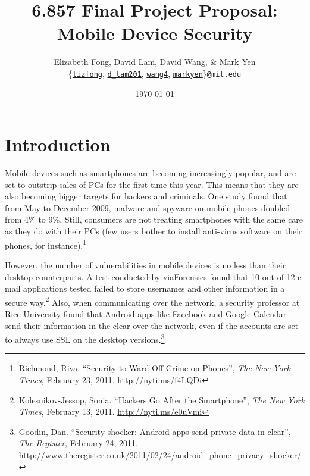 \documentclass[11pt]{article}
\begin{document}
\title{6.857 Final Project Proposal: Mobile Device Security}
\author{Elizabeth Fong, David Lam, David Wang, \& Mark Yen\\
\{\href{mailto:lizfong@mit.edu}{\texttt{lizfong}}, \href{mailto:d_lam201@mit.edu}{\texttt{d\_lam201}}, \href{mailto:wang4@mit.edu}{\texttt{wang4}}, \href{mailto:markyen@mit.edu}{\texttt{markyen}}\}\texttt{@mit.edu}}
\date{\today}
\maketitle

\section{Introduction}
Mobile devices such as smartphones are becoming increasingly popular, and are set to outstrip sales of PCs for the first time this year. This means that they are also becoming bigger targets for hackers and criminals. One study found that from May to December 2009, malware and spyware on mobile phones doubled from 4\% to 9\%. Still, consumers are not treating smartphones with the same care as they do with their PCs (few users bother to install anti-virus software on their phones, for instance).\footnote{Richmond, Riva. ``Security to Ward Off Crime on Phones'', \textit{The New York Times}, February 23, 2011. \url{http://nyti.ms/f4LQDi}}

However, the number of vulnerabilities in mobile devices is no less than their desktop counterparts. A test conducted by viaForensics found that 10 out of 12 e-mail applications tested failed to store usernames and other information in a secure way.\footnote{Kolesnikov-Jessop, Sonia. ``Hackers Go After the Smartphone'', \textit{The New York Times}, February 13, 2011. \url{http://nyti.ms/e0uVmi}} Also, when communicating over the network, a security professor at Rice University found that Android apps like Facebook and Google Calendar send their information in the clear over the network, even if the accounts are set to always use SSL on the desktop versions.\footnote{Goodin, Dan. ``Security shocker: Android apps send private data in clear'', \textit{The Register}, February 24, 2011. \url{http://www.theregister.co.uk/2011/02/24/android_phone_privacy_shocker/}}
\end{document}
